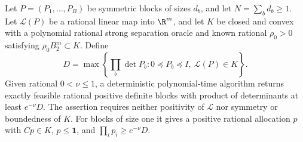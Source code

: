 \begin{lemma}\label{lem:block-logdet-oracle}
Let $P=(P_1,\ldots,P_B)$ be symmetric blocks of sizes $d_b$, and let
$N=\sum_bd_b\ge1$. Let $\mathcal L(P)$ be a rational linear map into
$\R^m$, and let $K$ be closed and convex with a polynomial rational
strong separation oracle and known rational $\rho_0>0$ satisfying
$\rho_0B_2^m\subset K$. Define
\[
 D=\max\left\{\prod_b\det P_b:0\preceq P_b\preceq I,
                                    \ \mathcal L(P)\in K\right\}.
\]
Given rational $0<\nu\le1$, a deterministic polynomial-time algorithm
returns exactly feasible rational positive definite blocks with product
of determinants at least $e^{-\nu}D$. The assertion requires neither
positivity of $\mathcal L$ nor symmetry or boundedness of $K$.
For blocks of size one it gives a positive rational allocation $p$ with
$Cp\in K$, $p\le\mathbf1$, and $\prod_ip_i\ge e^{-\nu}D$.
\end{lemma}

